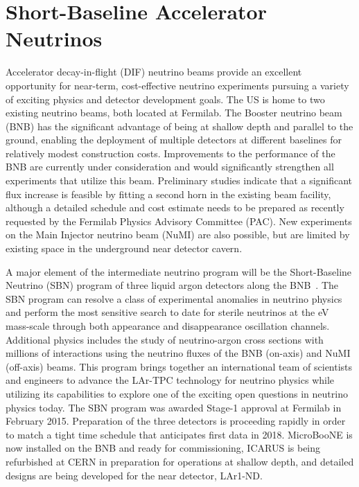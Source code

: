 \section{Short-Baseline Accelerator Neutrinos}
\label{sec:AcceleratorSB}

Accelerator decay-in-flight (DIF) neutrino beams provide an excellent
opportunity for near-term, cost-effective neutrino experiments
pursuing a variety of exciting physics and detector development goals.
The US is home to two existing neutrino beams, both located at
Fermilab.  The Booster neutrino beam (BNB) has the significant
advantage of being at shallow depth and parallel to the ground,
enabling the deployment of multiple detectors at different baselines
for relatively modest construction costs.  Improvements to the
performance of the BNB are currently under consideration and would
significantly strengthen all experiments that utilize this beam.
Preliminary studies indicate that a significant flux increase is
feasible by fitting a second horn in the existing beam facility,
although a detailed schedule and cost estimate needs to be prepared as
recently requested by the Fermilab Physics Advisory Committee
(PAC). New experiments on the Main Injector neutrino beam (NuMI) are
also possible, but are limited by existing space in the underground
near detector cavern.

A major element of the intermediate neutrino program will be the
Short-Baseline Neutrino (SBN) program of three liquid argon detectors
along the BNB~\cite{SBNProposal}.  The SBN program can resolve a class
of experimental anomalies in neutrino physics and perform the most
sensitive search to date for sterile neutrinos at the eV mass-scale
through both appearance and disappearance oscillation
channels. Additional physics includes the study of neutrino-argon
cross sections with millions of interactions using the neutrino fluxes
of the BNB (on-axis) and NuMI (off-axis) beams.  This program brings
together an international team of scientists and engineers to advance
the LAr-TPC technology for neutrino physics while utilizing its
capabilities to explore one of the exciting open questions in neutrino
physics today.  The SBN program was awarded Stage-1 approval at
Fermilab in February 2015.  Preparation of the three detectors is
proceeding rapidly in order to match a tight time schedule that
anticipates first data in 2018.  MicroBooNE is now installed on the
BNB and ready for commissioning, ICARUS is being refurbished at CERN
in preparation for operations at shallow depth, and detailed designs
are being developed for the near detector, LAr1-ND.

